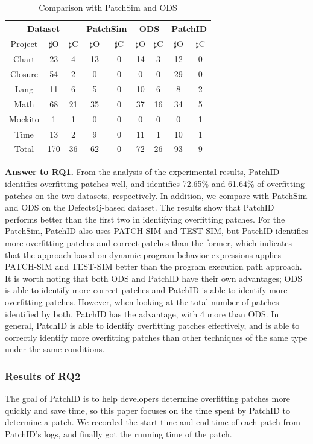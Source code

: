 \begin{table}[ht]
	\begin{minipage}{175px}
		\caption{Comparison with PatchSim and ODS}\label{tab6}%
		\begin{tabular}{ccccccccc}
			\toprule
		\multicolumn{3}{c|}{Dataset} &\multicolumn{2}{c|}{PatchSim} 
		& \multicolumn{2}{c|}{ODS}
		&\multicolumn{2}{c}{PatchID}\\
		\toprule
		Project &$\sharp$O &$\sharp$C &$\sharp$O &$\sharp$C &$\sharp$O &$\sharp$C &$\sharp$O &$\sharp$C\\

		
			\midrule
			Chart	&23	&4	&13	&0	&14	&3	&12	&0  \\
			Closure	&54	&2	&0	&0	&0	&0	&29&	0\\
			Lang	&11	&6	&5	&0	&10	&6	&8	&2\\
			Math	&68	&21	&35	&0	&37	&16	&34	&5\\
			Mockito	&1	&1	&0	&0	&0	&0	&0	&1\\
			Time	&13	&2	&9	&0	&11	&1	&10	&1\\
			Total	&170	&36	&62	&0	&72	&26&	93	&9\\
			\bottomrule
		\end{tabular}
	\end{minipage}
\end{table}
\textbf{Answer to RQ1.} From the analysis of the experimental results, PatchID identifies overfitting patches well, and identifies 72.65\% and 61.64\% of overfitting patches on the two datasets, respectively. In addition, we compare with PatchSim and ODS on the Defects4j-based dataset. The results show that PatchID performs better than the first two in identifying overfitting patches. For the PatchSim, PatchID also uses PATCH-SIM and TEST-SIM, but PatchID identifies more overfitting patches and correct patches than the former, which indicates that the approach based on dynamic program behavior expressions applies PATCH-SIM and TEST-SIM better than the program execution path approach. It is worth noting that both ODS and PatchID have their own advantages; ODS is able to identify more correct patches and PatchID is able to identify more overfitting patches. However, when looking at the total number of patches identified by both, PatchID has the advantage, with 4 more than ODS. In general, PatchID is able to identify overfitting patches effectively, and is able to correctly identify more overfitting patches than other techniques of the same type under the same conditions.

\subsubsection{Results of RQ2}\label{5.3.2}
The goal of PatchID is to help developers determine overfitting patches more quickly and save time, so this paper focuses on the time spent by PatchID to determine a patch. We recorded the start time and end time of each patch from PatchID's logs, and finally got the running time of the patch.

